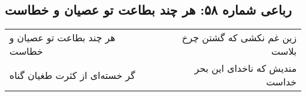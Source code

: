 \begin{center}
\section*{رباعی شماره ۵۸: هر چند بطاعت تو عصیان و خطاست}
\label{sec:sh058}
\begin{longtable}{l p{0.5cm} r}
هر چند بطاعت تو عصیان و خطاست
&&
زین غم نکشی که گشتن چرخ بلاست
\\
گر خسته‌ای از کثرت طغیان گناه
&&
مندیش که ناخدای این بحر خداست
\\
\end{longtable}
\end{center}
